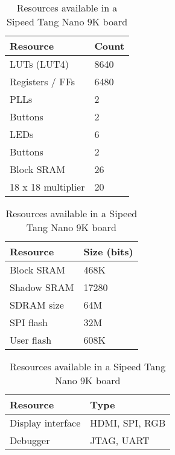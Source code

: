 \begin{table}
  \begin{minipage}{0.5\linewidth}
  \begin{tabular}{ll}
\toprule
    Resource           & Count          \\
\midrule
    LUTs (LUT4)        & 8640           \\
    Registers / FFs    & 6480           \\
    PLLs               & 2              \\
    Buttons            & 2              \\
    LEDs               & 6              \\
    Buttons            & 2              \\ 
    Block SRAM         & 26             \\
    18 x 18 multiplier & 20             \\
\bottomrule
\end{tabular}
\end{minipage}
\hfill
  \begin{minipage}{0.5\linewidth}
  \begin{tabular}{ll}
\toprule
    Resource           & Size (bits)    \\
\midrule
    Block SRAM         & 468K           \\
    Shadow SRAM        & 17280          \\
    SDRAM size         & 64M            \\
    SPI flash          & 32M            \\
    User flash         & 608K           \\
\bottomrule
  \end{tabular}
  \begin{tabular}{ll}
\toprule
    Resource           & Type           \\
\midrule
    Display interface  & HDMI, SPI, RGB \\
    Debugger           & JTAG, UART     \\
\bottomrule
  \end{tabular}
  \end{minipage}
  \caption{Resources available in a Sipeed Tang Nano 9K board}
  \label{tab:sipeed-resources}
\end{table}


